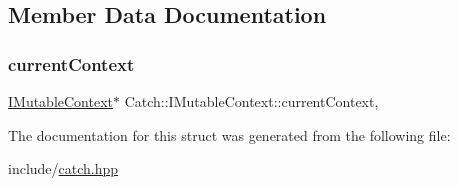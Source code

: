 \subsection{Member Data Documentation}
\mbox{\label{struct_catch_1_1_i_mutable_context_aca4de034d0deed74dba34f143e4e273e}} 
\subsubsection{\texorpdfstring{currentContext}{currentContext}}
{\footnotesize\ttfamily \mbox{\hyperlink{struct_catch_1_1_i_mutable_context}{I\+Mutable\+Context}}$\ast$ Catch\+::\+I\+Mutable\+Context\+::current\+Context\hspace{0.3cm}{\ttfamily [static]}, {\ttfamily [private]}}



The documentation for this struct was generated from the following file\+:\begin{DoxyCompactItemize}
\item 
include/\mbox{\hyperlink{catch_8hpp}{catch.\+hpp}}\end{DoxyCompactItemize}
